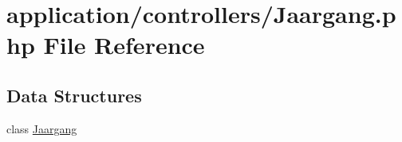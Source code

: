 \hypertarget{_jaargang_8php}{}\section{application/controllers/\+Jaargang.php File Reference}
\label{_jaargang_8php}
\subsection*{Data Structures}
\begin{DoxyCompactItemize}
\item 
class \mbox{\hyperlink{class_jaargang}{Jaargang}}
\end{DoxyCompactItemize}
